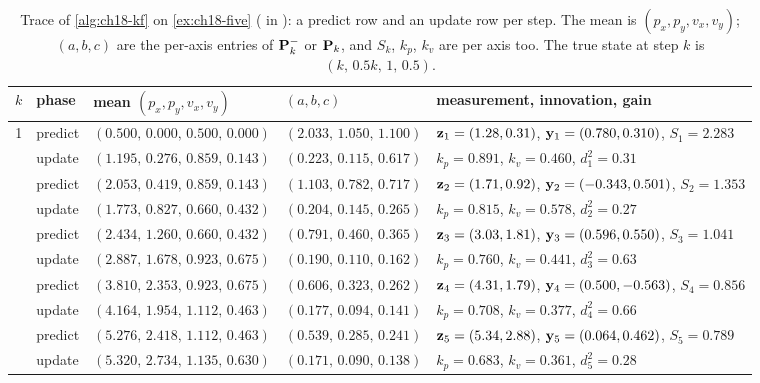 \begin{table}[tb]
  \centering\footnotesize
  \caption{Trace of \cref{alg:ch18-kf} on \cref{ex:ch18-five}
  ( in ): a predict row and an
  update row per step. The mean is $(p_x,p_y,v_x,v_y)$; $(a,b,c)$ are the
  per-axis entries of $\mat{P}^-_k$ or $\mat{P}_k$, and $S_k$, $k_p$, $k_v$
  are per axis too. The true state at step $k$ is $(k,\,0.5k,\,1,\,0.5)$.}
  \label{tab:ch18-trace}
  \begin{tabular}{@{}rlllL{5.3cm}@{}}
  \toprule
  $k$ & phase & mean $(p_x,p_y,v_x,v_y)$ & $(a,b,c)$ & measurement, innovation, gain\\
   & predict & $(0.500,\,0.000,\,0.500,\,0.000)$ & $(2.033,\,1.050,\,1.100)$ & $\mathbf{z}_1=(1.28,0.31)$, $\mathbf{y}_1=(0.780,0.310)$, $S_1=2.283$\\
    & update  & $(1.195,\,0.276,\,0.859,\,0.143)$ & $(0.223,\,0.115,\,0.617)$ & $k_p=0.891$, $k_v=0.460$, $d^2_1=0.31$\\
   & predict & $(2.053,\,0.419,\,0.859,\,0.143)$ & $(1.103,\,0.782,\,0.717)$ & $\mathbf{z}_2=(1.71,0.92)$, $\mathbf{y}_2=(-0.343,0.501)$, $S_2=1.353$\\
    & update  & $(1.773,\,0.827,\,0.660,\,0.432)$ & $(0.204,\,0.145,\,0.265)$ & $k_p=0.815$, $k_v=0.578$, $d^2_2=0.27$\\
   & predict & $(2.434,\,1.260,\,0.660,\,0.432)$ & $(0.791,\,0.460,\,0.365)$ & $\mathbf{z}_3=(3.03,1.81)$, $\mathbf{y}_3=(0.596,0.550)$, $S_3=1.041$\\
    & update  & $(2.887,\,1.678,\,0.923,\,0.675)$ & $(0.190,\,0.110,\,0.162)$ & $k_p=0.760$, $k_v=0.441$, $d^2_3=0.63$\\
   & predict & $(3.810,\,2.353,\,0.923,\,0.675)$ & $(0.606,\,0.323,\,0.262)$ & $\mathbf{z}_4=(4.31,1.79)$, $\mathbf{y}_4=(0.500,-0.563)$, $S_4=0.856$\\
    & update  & $(4.164,\,1.954,\,1.112,\,0.463)$ & $(0.177,\,0.094,\,0.141)$ & $k_p=0.708$, $k_v=0.377$, $d^2_4=0.66$\\
   & predict & $(5.276,\,2.418,\,1.112,\,0.463)$ & $(0.539,\,0.285,\,0.241)$ & $\mathbf{z}_5=(5.34,2.88)$, $\mathbf{y}_5=(0.064,0.462)$, $S_5=0.789$\\
    & update  & $(5.320,\,2.734,\,1.135,\,0.630)$ & $(0.171,\,0.090,\,0.138)$ & $k_p=0.683$, $k_v=0.361$, $d^2_5=0.28$\\
  \bottomrule
  \end{tabular}
\end{table}

